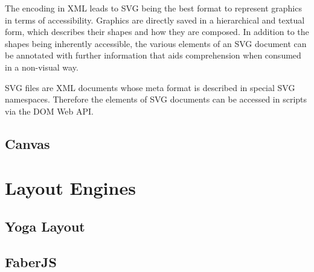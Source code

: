The encoding in XML leads to SVG being the best format to represent graphics in terms of accessibility. Graphics are directly saved in a hierarchical and textual form, which describes their shapes and how they are composed. In addition to the shapes being inherently accessible, the various elements of an SVG document can be annotated with further information that aids comprehension when consumed in a non-visual way. 

SVG files are XML documents whose meta format is described in special SVG namespaces. Therefore the elements of SVG documents can be accessed in scripts via the DOM Web API.  





\subsection{Canvas}

\section{Layout Engines}

\subsection{Yoga Layout}
\subsection{FaberJS}

